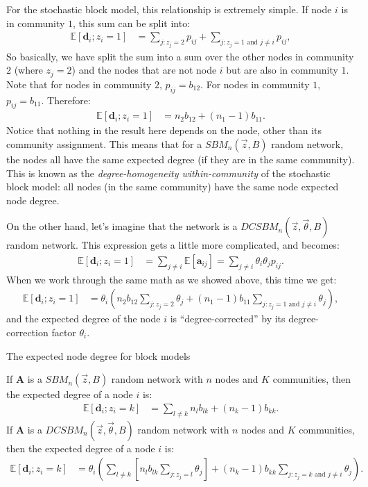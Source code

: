For the stochastic block model, this relationship is extremely simple. If node $i$ is in community $1$, this sum can be split into:
\begin{align*}
    \mathbb E[\mathbf d_i ; z_i = 1] &= \sum_{j : z_j = 2}p_{ij} + \sum_{j : z_j = 1\text{ and }j \neq i}p_{ij},
\end{align*}
So basically, we have split the sum into a sum over the other nodes in community $2$ (where $z_j = 2$) and the nodes that are not node $i$ but are also in community $1$. Note that for nodes in community $2$, $p_{ij} = b_{12}$. For nodes in community $1$, $p_{ij} = b_{11}$. Therefore:
\begin{align*}
    \mathbb E[\mathbf d_i ; z_i = 1] &= n_2 b_{12} + (n_1 - 1) b_{11}.
\end{align*}
Notice that nothing in the result here depends on the node, other than its community assignment. This means that for a $SBM_n(\vec z, B)$ random network, the nodes all have the same expected degree (if they are in the same community). This is known as the \textit{degree-homogeneity within-community} of the stochastic block model: all nodes (in the same community) have the same node expected node degree.

On the other hand, let's imagine that the network is a $DCSBM_n(\vec z, \vec \theta, B)$ random network. This expression gets a little more complicated, and becomes:
\begin{align*}
    \mathbb E[\mathbf d_i ; z_i = 1] &= \sum_{j \neq i} \mathbb E[\mathbf a_{ij}] = \sum_{j \neq i}\theta_i\theta_j p_{ij}.
\end{align*}
When we work through the same math as we showed above, this time we get:
\begin{align*}
    \mathbb E[\mathbf d_i ; z_i = 1] &= \theta_i \left(n_2 b_{12}\sum_{j : z_j = 2}\theta_j + (n_1 - 1) b_{11}\sum_{j : z_j = 1\text{ and }j \neq i}\theta_j\right),
\end{align*}
and the expected degree of the node $i$ is ``degree-corrected'' by its degree-correction factor $\theta_i$. 

\begin{floatingbox}[h]\caption{The expected node degree for block models}
If $\mathbf A$ is a $SBM_n(\vec z, B)$ random network with $n$ nodes and $K$ communities, then the expected degree of a node $i$ is:
\begin{align*}
    \mathbb E[\mathbf d_i ; z_i = k] &= \sum_{l \neq k} n_l b_{lk} + (n_k - 1)b_{kk}.
\end{align*}
If $\mathbf A$ is a $DCSBM_n(\vec z, \vec \theta, B)$ random network with $n$ nodes and $K$ communities, then the expected degree of a node $i$ is:
\begin{align*}
    \mathbb E[\mathbf d_i; z_i = k] &= \theta_i \left(\sum_{l \neq k}\left[n_l b_{lk}\sum_{j : z_j = l}\theta_j\right] + (n_k - 1)b_{kk}\sum_{j : z_j = k\text{ and }j \neq i}\theta_j\right).
\end{align*}
\end{floatingbox}

\newpage